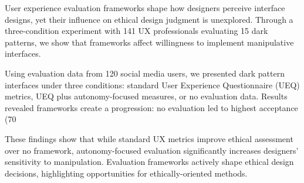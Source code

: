 
User experience evaluation frameworks shape how designers perceive interface designs, yet their influence on ethical design judgment is unexplored. Through a three-condition experiment with 141 UX professionals evaluating 15 dark patterns, we show that frameworks affect willingness to implement manipulative interfaces.

Using evaluation data from 120 social media users, we presented dark pattern interfaces under three conditions: standard User Experience Questionnaire (UEQ) metrics, UEQ plus autonomy-focused measures, or no evaluation data. Results revealed frameworks create a progression: no evaluation led to highest acceptance (70%

These findings show that while standard UX metrics improve ethical assessment over no framework, autonomy-focused evaluation significantly increases designers’ sensitivity to manipulation. Evaluation frameworks actively shape ethical design decisions, highlighting opportunities for ethically-oriented methods.

